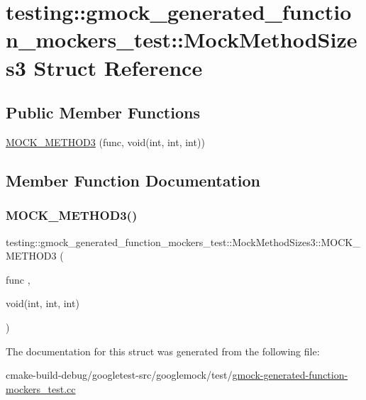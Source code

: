 \hypertarget{structtesting_1_1gmock__generated__function__mockers__test_1_1MockMethodSizes3}{}\section{testing\+::gmock\+\_\+generated\+\_\+function\+\_\+mockers\+\_\+test\+::Mock\+Method\+Sizes3 Struct Reference}
\label{structtesting_1_1gmock__generated__function__mockers__test_1_1MockMethodSizes3}
\subsection*{Public Member Functions}
\begin{DoxyCompactItemize}
\item 
\mbox{\hyperlink{structtesting_1_1gmock__generated__function__mockers__test_1_1MockMethodSizes3_a53c9699f920b15d624620e8dab0bfc62}{M\+O\+C\+K\+\_\+\+M\+E\+T\+H\+O\+D3}} (func, void(int, int, int))
\end{DoxyCompactItemize}


\subsection{Member Function Documentation}
\mbox{\label{structtesting_1_1gmock__generated__function__mockers__test_1_1MockMethodSizes3_a53c9699f920b15d624620e8dab0bfc62}} 
\subsubsection{\texorpdfstring{MOCK\_METHOD3()}{MOCK\_METHOD3()}}
{\footnotesize\ttfamily testing\+::gmock\+\_\+generated\+\_\+function\+\_\+mockers\+\_\+test\+::\+Mock\+Method\+Sizes3\+::\+M\+O\+C\+K\+\_\+\+M\+E\+T\+H\+O\+D3 (\begin{DoxyParamCaption}\item[{func}]{,  }\item[{void(int, int, int)}]{ }\end{DoxyParamCaption})}



The documentation for this struct was generated from the following file\+:\begin{DoxyCompactItemize}
\item 
cmake-\/build-\/debug/googletest-\/src/googlemock/test/\mbox{\hyperlink{gmock-generated-function-mockers__test_8cc}{gmock-\/generated-\/function-\/mockers\+\_\+test.\+cc}}\end{DoxyCompactItemize}
